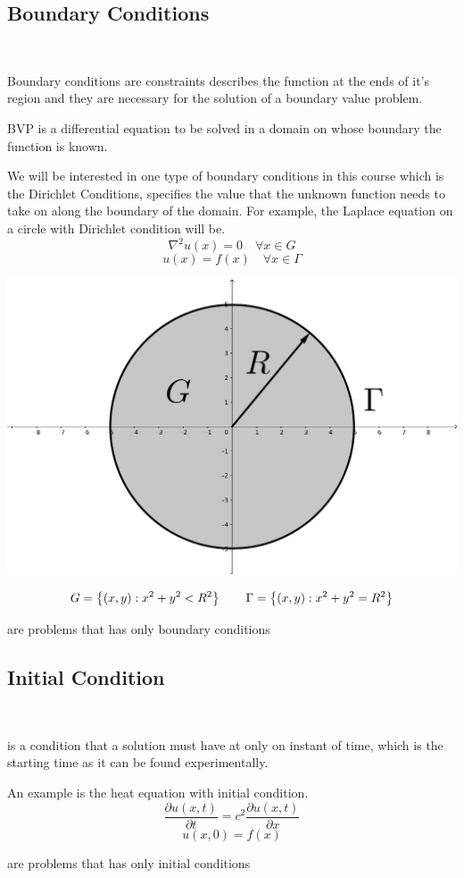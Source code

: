 \subsection{Boundary Conditions}
\
\begin{definition}
    Boundary conditions are constraints describes the function at the ends of it's region and they are necessary for the solution of a boundary value problem.
\end{definition}
\begin{definition}
    BVP is a differential equation to be solved in a domain on whose boundary the function is known.
\end{definition}
We will be interested in one type of boundary conditions in this course which is the Dirichlet Conditions, specifies the value that the unknown function needs to take on along the boundary of the domain. For example, the Laplace equation on a circle with Dirichlet condition will be.
\[
    \nabla^2 u(x) = 0 \quad \forall x \in G    
\]
\[
    u(x) = f(x) \quad \forall x \in \Gamma    
\]
\begin{center}
\includegraphics[scale=0.1]{laplacecircle.png} 
\end{center}
\[
    G = \left\lbrace (x,y):x^2+y^2 < R^2 \right\rbrace  \quad\quad \Gamma = \left\lbrace (x,y):x^2+y^2 = R^2 \right\rbrace    
\]
\begin{definition}
    are problems that has only boundary conditions
\end{definition}
\subsection{Initial Condition}
\
\begin{definition}
    is a condition that a solution must have at only on instant of time, which is the starting time as it can be found experimentally.
\end{definition}
An example is the heat equation with initial condition.
\[
    \frac{\partial u(x,t)}{\partial t}  = c^2 \frac{\partial u(x,t)}{\partial x}
\]
\[
    u(x,0) = f(x)
\]
\begin{definition}
    are problems that has only initial conditions
\end{definition}

